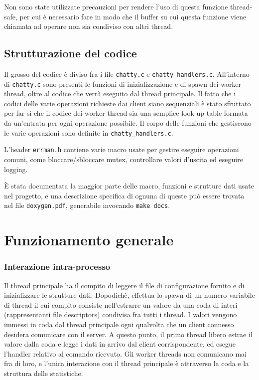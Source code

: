 \documentclass[11pt]{article} %
\begin{document}
Non sono state utilizzate precauzioni per rendere l'uso di questa funzione thread-safe, per cui è necessario fare in modo che il buffer su cui questa funzione viene chiamata ad operare non sia condiviso con altri thread.

\subsection{Strutturazione del codice}
Il grosso del codice è diviso fra i file \texttt{chatty.c} e \texttt{chatty\_handlers.c}. All'interno di \texttt{chatty.c} sono presenti le funzioni di inizializzazione e di spawn dei worker thread, oltre al codice che verrà eseguito dal thread principale. Il fatto che i codici delle varie operazioni richieste dai client siano sequenziali è stato sfruttato per far sì che il codice dei worker thread sia una semplice look-up table formata da un'entrata per ogni operazione possibile. Il corpo delle funzioni che gestiscono le varie operazioni sono definite in \texttt{chatty\_handlers.c}.

L'header \texttt{errman.h} contiene varie macro usate per gestire eseguire operazioni comuni, come bloccare/sbloccare mutex, controllare valori d'uscita ed eseguire logging.

\`{E} stata documentata la maggior parte delle macro, funzioni e strutture dati usate nel progetto, e una descrizione specifica di ognuna di queste può essere trovata nel file \texttt{doxygen.pdf}, generabile invocando \texttt{make docs}.

\section{Funzionamento generale}
\subsubsection{Interazione intra-processo}
Il thread principale ha il compito di leggere il file di configurazione fornito e di inizializzare le strutture dati. Dopodichè, effettua lo spawn di un numero variabile di thread il cui compito consiste nell'estrarre un valore da una coda di interi (rappresentanti file descriptors) condivisa fra tutti i thread. I valori vengono immessi in coda dal thread principale ogni qualvolta che un client connesso desidera comunicare con il server. A questo punto, il primo thread libero estrae il valore dalla coda e legge i dati in arrivo dal client corrispondente, ed esegue l'handler relativo al comando ricevuto. Gli worker threads non comunicano mai fra di loro, e l'unica interazione con il thread principale è attraverso la coda e la struttura delle statistiche.
\end{document}
